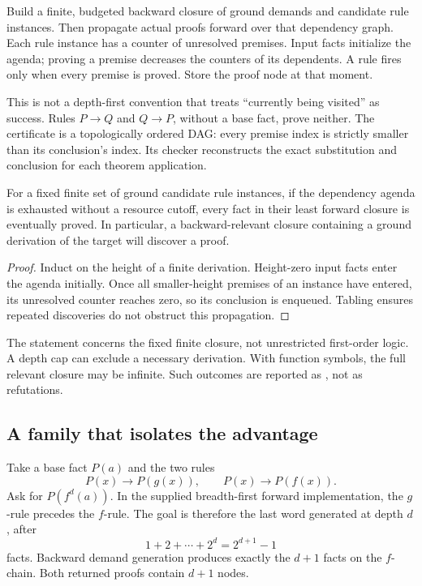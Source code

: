 Build a finite, budgeted backward closure of ground demands and candidate rule
instances. Then propagate actual proofs forward over that dependency graph.
Each rule instance has a counter of unresolved premises. Input facts initialize
the agenda; proving a premise decreases the counters of its dependents. A rule
fires only when every premise is proved. Store the proof node at that moment.

This is not a depth-first convention that treats ``currently being visited''
as success. Rules $P\to Q$ and $Q\to P$, without a base fact, prove neither.
The certificate is a topologically ordered DAG: every premise index is strictly
smaller than its conclusion's index. Its checker reconstructs the exact
substitution and conclusion for each theorem application.

\begin{proposition}
For a fixed finite set of ground candidate rule instances, if the dependency
agenda is exhausted without a resource cutoff, every fact in their least
forward closure is eventually proved. In particular, a backward-relevant
closure containing a ground derivation of the target will discover a proof.
\end{proposition}
\begin{proof}
Induct on the height of a finite derivation. Height-zero input facts enter the
agenda initially. Once all smaller-height premises of an instance have entered,
its unresolved counter reaches zero, so its conclusion is enqueued. Tabling
ensures repeated discoveries do not obstruct this propagation.
\end{proof}

The statement concerns the fixed finite closure, not unrestricted first-order
logic. A depth cap can exclude a necessary derivation. With function symbols,
the full relevant closure may be infinite. Such outcomes are reported as
, not as refutations.

\subsection{A family that isolates the advantage}

Take a base fact $P(a)$ and the two rules
\[
 P(x)\to P(g(x)),\qquad P(x)\to P(f(x)).
\]
Ask for $P(f^d(a))$. In the supplied breadth-first forward implementation, the
$g$-rule precedes the $f$-rule. The goal is therefore the last word generated at
depth $d$, after
\[
 1+2+\cdots+2^d=2^{d+1}-1
\]
facts. Backward demand generation produces exactly the $d+1$ facts on the
$f$-chain. Both returned proofs contain $d+1$ nodes.

